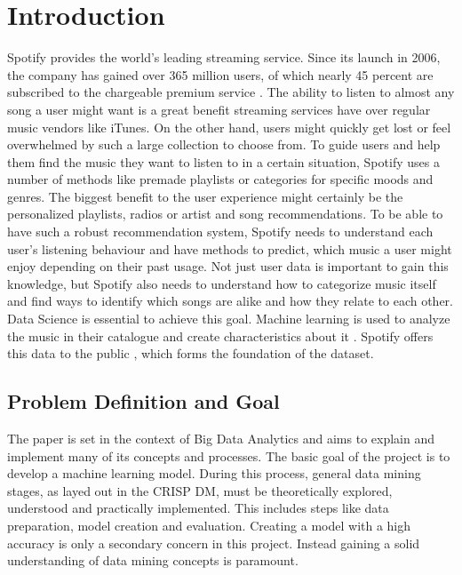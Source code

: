 \section{Introduction}

Spotify provides the world's leading streaming service.
Since its launch in 2006, the company has gained over 365 million users, of
which nearly 45 percent are subscribed to the chargeable premium service \cite[]{L.Rabe2021}.
The ability to listen to almost any song a user might want
is a great benefit streaming services have over regular music vendors
like iTunes. On the other hand, users might quickly get lost or feel overwhelmed by such
a large collection to choose from.
To guide users and help them find the music they want to listen to in a certain situation,
Spotify uses a number of methods like premade playlists or categories for specific moods and
genres. The biggest benefit to the user experience might certainly be the personalized
playlists, radios or artist and song recommendations.
To be able to have such a robust recommendation system, Spotify needs to understand each user's
listening behaviour and have methods to predict, which music a user might enjoy depending
on their past usage.
Not just user data is important to gain this knowledge, but Spotify also needs to understand
how to categorize music itself and find ways to identify which songs are alike and how they
relate to each other.
Data Science is essential to achieve this goal. Machine learning is used 
to analyze the music in their catalogue and create characteristics about it \cite{Rangaiah2021}.
Spotify offers this data to the public \cite{SpotifyWebAPI}, which forms the foundation of the dataset.

\subsection{Problem Definition and Goal}

The paper is set in the context of Big Data Analytics and aims to explain and implement
many of its concepts and processes.
The basic goal of the project is to develop a machine learning model.
During this process, general data mining stages, as layed out in the \ac{CRISP DM},
must be theoretically explored, understood and practically implemented. This includes steps like data
preparation, model creation and evaluation. Creating a model with a high accuracy is only a secondary
concern in this project. Instead gaining a solid understanding of data mining concepts is paramount.

